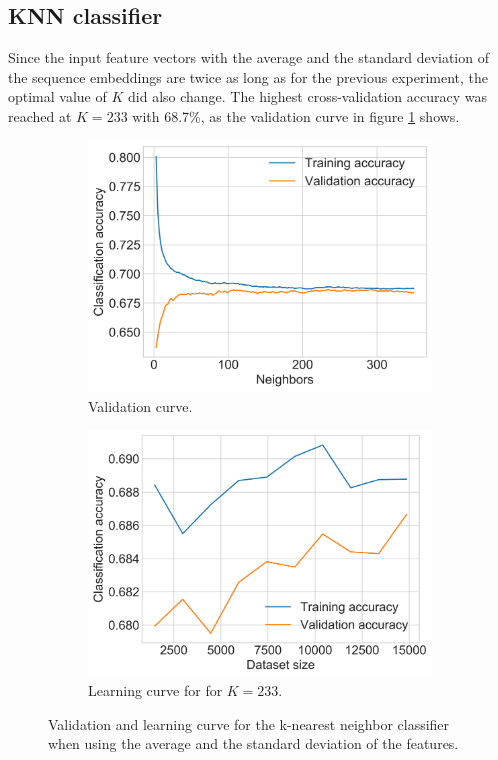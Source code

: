\subsection{\acl{KNN} classifier}
Since the input feature vectors with the average and the standard deviation of the sequence embeddings are twice as long as for the previous experiment, the optimal value of $K$ did also change.
The highest cross-validation accuracy was reached at $K=233$ with 68.7\%, as the validation curve in figure \ref{figure:knn_validation_std} shows.
\begin{figure}[h]
    \begin{subfigure}{0.5\textwidth}
        \centering
        \includegraphics[width=\textwidth]{figures/charts/training_with_std/knn_validation.png}
        \caption{Validation curve.}
        \label{figure:knn_validation_std}
    \end{subfigure}
    \begin{subfigure}{0.5\textwidth}
        \centering
        \includegraphics[width=\textwidth]{figures/charts/training_with_std/knn_learning.png}
        \caption{Learning curve for for $K=233$.}
        \label{figure:knn_learning_std}
    \end{subfigure}
    \caption{Validation and learning curve for the k-nearest neighbor classifier when using the average and the standard deviation of the features.}
    \label{figure:knn_std}
\end{figure}
